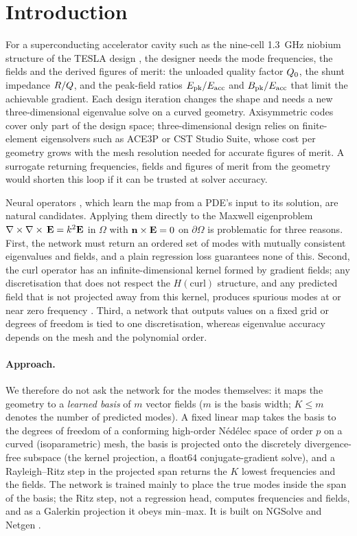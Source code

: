 \section{Introduction}\label{sec:introduction}

For a superconducting accelerator cavity such as the nine-cell \SI{1.3}{GHz} niobium structure of the TESLA design \citep{aune2000superconducting,padamsee2009rf},
the designer needs the mode frequencies, the fields and the derived figures of merit:
the unloaded quality factor $\Qz$, the shunt impedance $R/Q$, and the
peak-field ratios $\Epk/\Eacc$ and $\Bpk/\Eacc$ that limit the achievable gradient.
Each design iteration changes the shape and needs a new three-dimensional eigenvalue solve on a curved geometry.
Axisymmetric codes \citep{halbach1976superfish} cover only part of the design space; three-dimensional design relies on finite-element eigensolvers such as ACE3P \citep{ko2010advances} or CST Studio Suite, whose cost per geometry grows with the mesh resolution needed for accurate figures of merit.
A surrogate returning frequencies, fields and figures of merit from the geometry would shorten this loop if it can be trusted at solver accuracy.

Neural operators \citep{lu2021learning,li2021fourier,kovachki2023neural}, which learn the map from a PDE's input to its solution, are natural candidates.
Applying them directly to the Maxwell eigenproblem $\nabla\times\nabla\times\,\mathbf{E}=k^2\mathbf{E}$ in $\Omega$ with $\mathbf{n}\times\mathbf{E}=0$ on $\partial\Omega$ is problematic for three reasons.
First, the network must return an ordered set of modes with mutually consistent eigenvalues and fields, and a plain regression loss guarantees none of this.
Second, the curl operator has an infinite-dimensional kernel formed by gradient fields;
any discretisation that does not respect the $H(\mathrm{curl})$ structure, and any predicted field that is not projected away from this kernel,
produces spurious modes at or near zero frequency \citep{hiptmair2002finite,boffi2010finite}.
Third, a network that outputs values on a fixed grid or degrees of freedom is tied to one discretisation, whereas eigenvalue accuracy depends on the mesh and the polynomial order.

\paragraph{Approach.}
We therefore do not ask the network for the modes themselves: it maps the geometry to a \emph{learned basis} of $m$ vector fields ($m$ is the basis width; $K\le m$ denotes the number of predicted modes).
A fixed linear map takes the basis to the degrees of freedom of a conforming high-order N\'ed\'elec space \citep{nedelec1980mixed} of order $p$ on a curved (isoparametric) mesh,
the basis is projected onto the discretely divergence-free subspace (the kernel projection, a float64 conjugate-gradient solve),
and a Rayleigh--Ritz step in the projected span returns the $K$ lowest frequencies and the fields.
The network is trained mainly to place the true modes inside the span of the basis; the Ritz step, not a regression head, computes frequencies and fields, and as a Galerkin projection it obeys min--max.
It is built on NGSolve and Netgen \citep{schoberl1997netgen,schoberl2014cpp11}.

